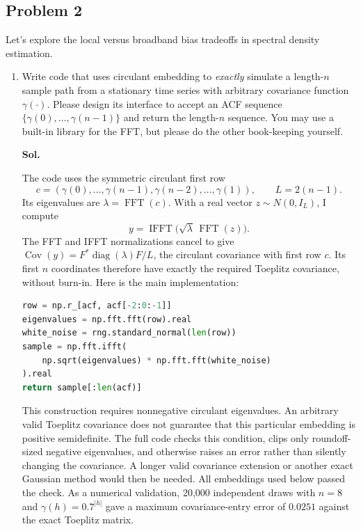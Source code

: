 \documentclass[lang=en,11pt,a4paper,citestyle =authoryear,nobib=true]{elegantpaper}
\begin{document}
\subsection*{Problem 2}
Let's explore the local versus broadband bias tradeoffs in spectral density estimation.
\begin{enumerate}[label=\arabic*.,leftmargin=*]
\item Write code that uses circulant embedding to \emph{exactly} simulate a length-$n$ sample path from a stationary time series with arbitrary covariance function $\gamma(\cdot)$. Please design its interface to accept an ACF sequence $\{\gamma(0),\ldots,\gamma(n-1)\}$ and return the length-$n$ sequence. You may use a built-in library for the FFT, but please do the other book-keeping yourself.
\par\vspace{0.5em}\textbf{Sol.}\par

The code uses the symmetric circulant first row
\[
c=(\gamma(0),\ldots,\gamma(n-1),\gamma(n-2),\ldots,\gamma(1)),
\qquad L=2(n-1).
\]
Its eigenvalues are $\lambda=\operatorname{FFT}(c)$. With a real vector
$z\sim N(0,I_L)$, I compute
\[
y=\operatorname{IFFT}\bigl(\sqrt\lambda\,
\operatorname{FFT}(z)\bigr).
\]
The FFT and IFFT normalizations cancel to give
$\operatorname{Cov}(y)=F^*\operatorname{diag}(\lambda)F/L$,
the circulant covariance with first row $c$. Its first $n$ coordinates
therefore have exactly the required Toeplitz covariance, without burn-in.
Here is the main implementation:
\begin{lstlisting}[language=Python]
row = np.r_[acf, acf[-2:0:-1]]
eigenvalues = np.fft.fft(row).real
white_noise = rng.standard_normal(len(row))
sample = np.fft.ifft(
    np.sqrt(eigenvalues) * np.fft.fft(white_noise)
).real
return sample[:len(acf)]
\end{lstlisting}
This construction requires nonnegative circulant eigenvalues. An arbitrary
valid Toeplitz covariance does not guarantee that this particular embedding
is positive semidefinite. The full code checks this condition, clips only
roundoff-sized negative eigenvalues, and otherwise raises an error rather
than silently changing the covariance. A longer valid covariance extension
or another exact Gaussian method would then be needed. All embeddings used
below passed the check. As a numerical validation, 20,000 independent draws
with $n=8$ and $\gamma(h)=0.7^{|h|}$ gave a maximum covariance-entry error
of $0.0251$ against the exact Toeplitz matrix.
\vspace{1em}


\end{enumerate}
\end{document}
